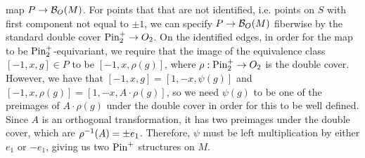 \begin{exmp}
map $P \to \mathcal{B}_O(M)$. For points that that are not identified, i.e. points
on $S$ with first component not equal to $\pm 1$, we can specify
$P \to \mathcal{B}_O(M)$ fiberwise by the standard double cover $\mathrm{Pin}_2^+ \to O_2$. On
the identified edges, in order for the map to be $\mathrm{Pin}_2^+$-equivariant, we
require that the image of the equivalence class $[-1,x,g] \in P$ to be
$[-1, x, \rho(g)]$, where $\rho : \mathrm{Pin}_2^+ \to O_2$ is the double cover. However,
we have that $[-1,x,g] = [1, -x, \psi(g)]$ and
$[-1,x,\rho(g)] = [1,-x, A \cdot \rho(g)]$, so we need $\psi(g)$ to be one
of the preimages of $A \cdot \rho(g)$ under the double cover in order for this
to be well defined. Since $A$ is an orthogonal transformation, it has two
preimages under the double cover, which are $\rho^{-1}(A) = \pm e_1$. Therefore,
$\psi$ must be left multiplication by either $e_1$ or $-e_1$, giving us two
$\mathrm{Pin}^+$ structures on $M$. \\


\end{exmp}
